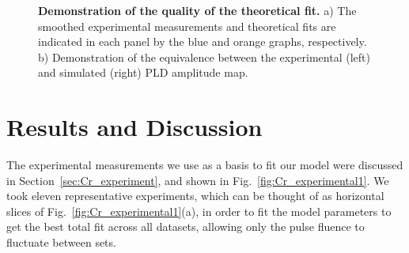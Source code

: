 \begin{figure}
\caption{\label{fig:Cr_theoretical_fit} {\bf Demonstration of the quality of the theoretical fit.} a) The smoothed experimental measurements and theoretical fits are indicated in each panel by the blue and orange graphs, respectively. b) Demonstration of the equivalence between the experimental (left) and simulated (right) PLD amplitude map.}
\end{figure}
\section{Results and Discussion \label{sec:Cr_results}}
The experimental measurements we use as a basis to fit our model were discussed in Section~\ref{sec:Cr_experiment}, and shown in Fig.~\ref{fig:Cr_experimental1}.
We took eleven representative experiments, which can be thought of as horizontal slices of Fig.~\ref{fig:Cr_experimental1}(a), in order to fit the model parameters to get the best total fit across all datasets, allowing only the pulse fluence to fluctuate between sets.

